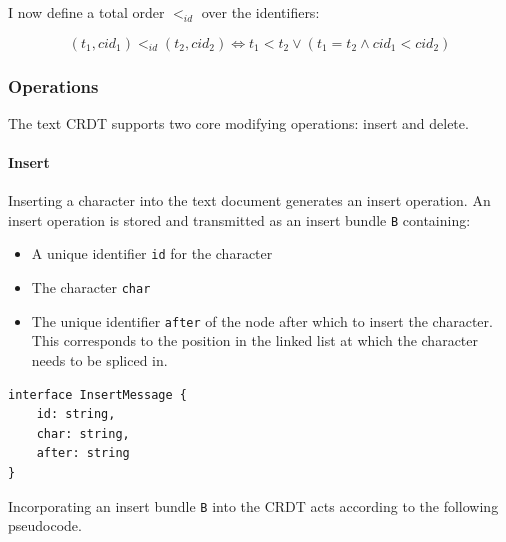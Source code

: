 \documentclass[12pt,a4paper,twoside,openright]{report}
\begin{document}
		
		I now define a total order $<_{id}$ over the identifiers:
		
		\[(t_1, cid_1) <_{id} (t_2, cid_2) \Leftrightarrow t_1 < t_2 \lor (t_1 = t_2 \land cid_1 < cid_2)\]
		
		
		\subsubsection{Operations}
		The text CRDT supports two core modifying operations: insert and delete.
		
			\paragraph{Insert}
				Inserting a character into the text document generates an insert operation. An insert operation is stored and transmitted as an insert bundle \texttt{B} containing: 
				\begin{itemize}
					\item A unique identifier \texttt{id} for the character
					\item The character \texttt{char}
					\item The unique identifier \texttt{after} of the node after which to insert the character. This corresponds to the position in the linked list at which the character needs to be spliced in.
				\end{itemize}
			
\vspace{3mm}	
\begin{lstlisting}[caption=Insert Bundle Type Signature]
interface InsertMessage {
    id: string,
    char: string,
    after: string
}
\end{lstlisting}
				
				Incorporating an insert bundle \texttt{B} into the CRDT acts according to the following pseudocode.
				
\end{document}
